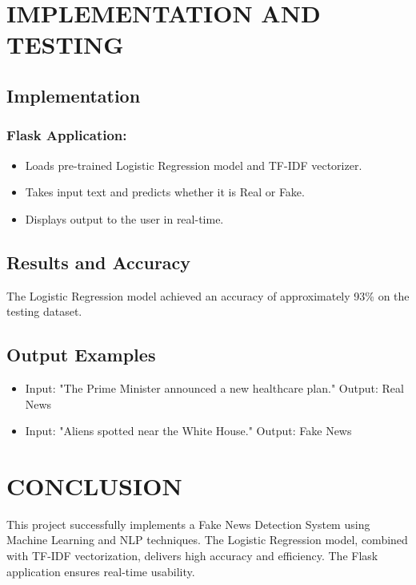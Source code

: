 \documentclass[12pt,a4paper]{report}
\begin{document}
\chapter{IMPLEMENTATION AND TESTING}
\label{chap:implementation}

\section{Implementation}
\subsection*{Flask Application:}
\begin{itemize}
    \item Loads pre-trained Logistic Regression model and TF-IDF vectorizer.
    \item Takes input text and predicts whether it is Real or Fake.
    \item Displays output to the user in real-time.
\end{itemize}

\section{Results and Accuracy}
The Logistic Regression model achieved an accuracy of approximately 93\% on the testing dataset.

\section{Output Examples}
\begin{itemize}
    \item Input: "The Prime Minister announced a new healthcare plan." Output: Real News
    \item Input: "Aliens spotted near the White House." Output: Fake News
\end{itemize}

\chapter{CONCLUSION}
\label{chap:conclusion}
This project successfully implements a Fake News Detection System using Machine Learning and NLP techniques. The Logistic Regression model, combined with TF-IDF vectorization, delivers high accuracy and efficiency. The Flask application ensures real-time usability.
\end{document}
